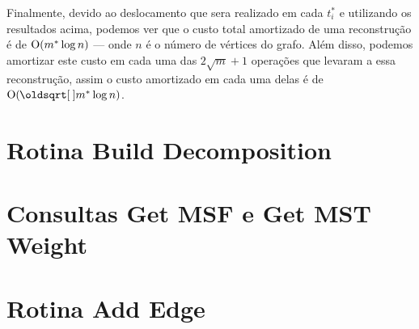 Finalmente, devido ao deslocamento que sera realizado em cada $t_i^*$ e utilizando os resultados acima, podemos ver que o custo total amortizado de uma reconstrução é de $\mathrm{O}(m^* \log{n})$ --- onde $n$ é o número de vértices do grafo. Além disso, podemos amortizar este custo em cada uma das $2\sqrt{m} + 1$ operações que levaram a essa reconstrução, assim o custo amortizado em cada uma delas é de $\Oh(\sqrt{m^*} \log{n})$.

\section{Rotina Build Decomposition}
\label{sec:rmsf-build-decomposition}



\section{Consultas Get MSF e Get MST Weight}
\label{sec:rmsf-get-msf}



\section{Rotina Add Edge}
\label{sec:rmsf-add-edge}

